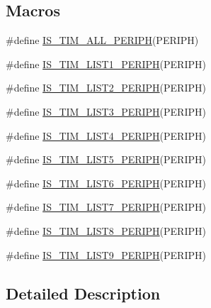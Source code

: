 \subsection*{Macros}
\begin{DoxyCompactItemize}
\item 
\#define \hyperlink{group___t_i_m___exported__constants_ga71710da28a59c007a1d2ddee18a5ffcc}{I\+S\+\_\+\+T\+I\+M\+\_\+\+A\+L\+L\+\_\+\+P\+E\+R\+I\+PH}(P\+E\+R\+I\+PH)
\item 
\#define \hyperlink{group___t_i_m___exported__constants_ga1abea04e3837b7683d8e8dc33441677f}{I\+S\+\_\+\+T\+I\+M\+\_\+\+L\+I\+S\+T1\+\_\+\+P\+E\+R\+I\+PH}(P\+E\+R\+I\+PH)
\item 
\#define \hyperlink{group___t_i_m___exported__constants_ga3c489ac3294f0d8f2ec097da909bc8e0}{I\+S\+\_\+\+T\+I\+M\+\_\+\+L\+I\+S\+T2\+\_\+\+P\+E\+R\+I\+PH}(P\+E\+R\+I\+PH)
\item 
\#define \hyperlink{group___t_i_m___exported__constants_ga2d80541c542755ac3f2aca078bd98adb}{I\+S\+\_\+\+T\+I\+M\+\_\+\+L\+I\+S\+T3\+\_\+\+P\+E\+R\+I\+PH}(P\+E\+R\+I\+PH)
\item 
\#define \hyperlink{group___t_i_m___exported__constants_ga9c2699fd3d0c0901f8ac706c3d2dfe10}{I\+S\+\_\+\+T\+I\+M\+\_\+\+L\+I\+S\+T4\+\_\+\+P\+E\+R\+I\+PH}(P\+E\+R\+I\+PH)
\item 
\#define \hyperlink{group___t_i_m___exported__constants_ga90232c3966a578fbd9be2b228f225cb4}{I\+S\+\_\+\+T\+I\+M\+\_\+\+L\+I\+S\+T5\+\_\+\+P\+E\+R\+I\+PH}(P\+E\+R\+I\+PH)
\item 
\#define \hyperlink{group___t_i_m___exported__constants_ga99fabffbddc9ca930f80a4480daeecbe}{I\+S\+\_\+\+T\+I\+M\+\_\+\+L\+I\+S\+T6\+\_\+\+P\+E\+R\+I\+PH}(P\+E\+R\+I\+PH)
\item 
\#define \hyperlink{group___t_i_m___exported__constants_ga421bba71d6e8fbe9a9d422ecd59e79be}{I\+S\+\_\+\+T\+I\+M\+\_\+\+L\+I\+S\+T7\+\_\+\+P\+E\+R\+I\+PH}(P\+E\+R\+I\+PH)
\item 
\#define \hyperlink{group___t_i_m___exported__constants_ga120d98895bd48d628028753212b68233}{I\+S\+\_\+\+T\+I\+M\+\_\+\+L\+I\+S\+T8\+\_\+\+P\+E\+R\+I\+PH}(P\+E\+R\+I\+PH)
\item 
\#define \hyperlink{group___t_i_m___exported__constants_ga24ff46311f2d074ec6bd93f2972d1d9b}{I\+S\+\_\+\+T\+I\+M\+\_\+\+L\+I\+S\+T9\+\_\+\+P\+E\+R\+I\+PH}(P\+E\+R\+I\+PH)
\end{DoxyCompactItemize}


\subsection{Detailed Description}


